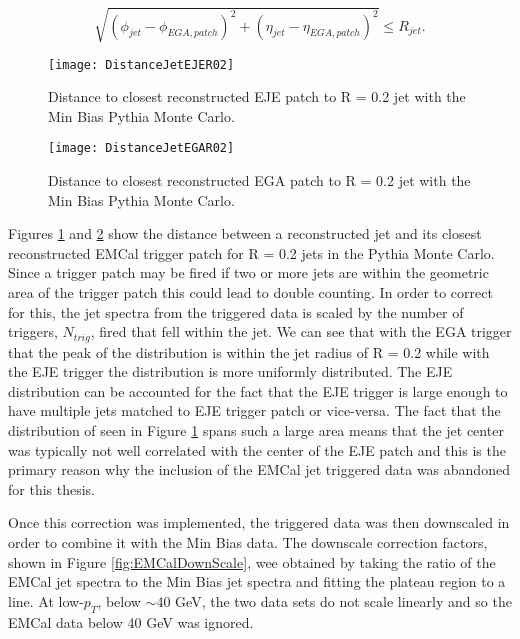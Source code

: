 \begin{equation}
\sqrt{ ( \phi_{jet} - \phi_{EGA, patch} )^{2} + ( \eta_{jet} - \eta_{EGA, patch} )^{2}}  \leq R_{jet} .
\label{eq:triggermatch}
\end{equation}

\begin{figure}[h]
\texttt{[image: DistanceJetEJER02]}
\centering
\caption{Distance to closest reconstructed EJE patch to R = 0.2 jet with the Min Bias Pythia Monte Carlo.}
\label{fig:DisJetEJE}
\end{figure}

\begin{figure}[h]
\texttt{[image: DistanceJetEGAR02]}
\centering
\caption{Distance to closest reconstructed EGA patch to R = 0.2 jet with the Min Bias Pythia Monte Carlo.}
\label{fig:DisJetEGA}
\end{figure}

\noindent
Figures \ref{fig:DisJetEJE} and \ref{fig:DisJetEGA} show the distance between a reconstructed jet and its closest reconstructed EMCal trigger patch for R = 0.2 jets in the Pythia Monte Carlo.  Since a trigger patch may be fired if two or more jets are within the geometric area of the trigger patch this could lead to double counting.  In order to correct for this, the jet spectra from the triggered data is scaled by the number of triggers, $N_{trig}$, fired that fell within the jet.  We can see that with the EGA trigger that the peak of the distribution is within the jet radius of R = 0.2 while with the EJE trigger the distribution is more uniformly distributed.  The EJE distribution can be accounted for the fact that the EJE trigger is large enough to have multiple jets matched to EJE trigger patch or vice-versa.  The fact that the distribution of seen in Figure \ref{fig:DisJetEJE} spans such a large area means that the jet center was typically not well correlated with the center of the EJE patch and this is the primary reason why the inclusion of the EMCal jet triggered data was abandoned for this thesis.

Once this correction was implemented, the triggered data was then downscaled in order to combine it with the Min Bias data.  The downscale correction factors, shown in Figure \ref{fig:EMCalDownScale}, wee obtained by taking the ratio of the EMCal jet spectra to the Min Bias jet spectra and fitting the plateau region to a line.  At low-$p_{T}$, below $\sim$40 GeV,  the two data sets do not scale linearly and so the EMCal data below 40 GeV was ignored.



